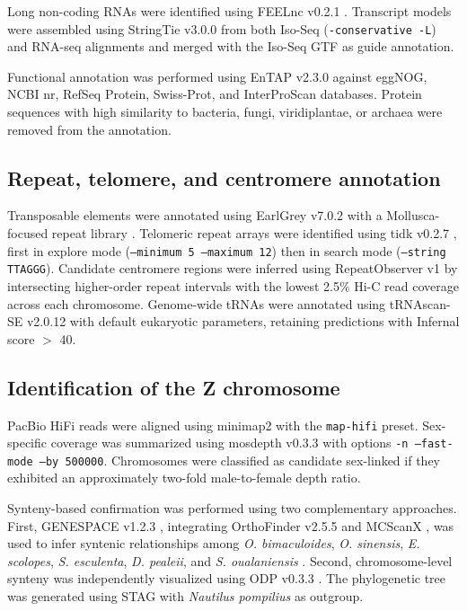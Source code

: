 \documentclass[12pt]{article}
\newcommand{\citep}{\parencite}
\begin{document}
Long non-coding RNAs were identified using FEELnc v0.2.1 \citep{Wucher2017FEELnc}.
Transcript models were assembled using StringTie v3.0.0 \citep{Pertea2015StringTie}
from both Iso-Seq (\texttt{-conservative -L}) and RNA-seq alignments
and merged with the Iso-Seq GTF as guide annotation.

Functional annotation was performed using EnTAP v2.3.0 \citep{Hart2019EnTAP}
against eggNOG, NCBI nr, RefSeq Protein, Swiss-Prot, and InterProScan databases.
Protein sequences with high similarity to bacteria, fungi, viridiplantae, or archaea
were removed from the annotation.

\subsection*{Repeat, telomere, and centromere annotation}

Transposable elements were annotated using EarlGrey v7.0.2 \citep{Barber2025EarlGrey}
with a Mollusca-focused repeat library \citep{Smit2013RepeatMasker}.
Telomeric repeat arrays were identified using tidk v0.2.7 \citep{Brown2025tidk},
first in explore mode (\texttt{--minimum 5 --maximum 12})
then in search mode (\texttt{--string TTAGGG}).
Candidate centromere regions were inferred using RepeatObserver v1 \citep{Schultz2025RepeatOBserver}
by intersecting higher-order repeat intervals
with the lowest 2.5\% Hi-C read coverage across each chromosome.
Genome-wide tRNAs were annotated using tRNAscan-SE v2.0.12 \citep{Chan2021tRNAscanSE}
with default eukaryotic parameters,
retaining predictions with Infernal score $>$ 40.

\subsection*{Identification of the Z chromosome}

PacBio HiFi reads were aligned using minimap2 \citep{Li2018}
with the \texttt{map-hifi} preset.
Sex-specific coverage was summarized using mosdepth v0.3.3 \citep{Pedersen2018Mosdepth}
with options \texttt{-n --fast-mode --by 500000}.
Chromosomes were classified as candidate sex-linked
if they exhibited an approximately two-fold male-to-female depth ratio.

Synteny-based confirmation was performed using two complementary approaches.
First, GENESPACE v1.2.3 \citep{Lovell2022GENESPACE},
integrating OrthoFinder v2.5.5 \citep{Emms2019OrthoFinder}
and MCScanX \citep{Wang2012MCScanX},
was used to infer syntenic relationships among
\textit{O. bimaculoides}, \textit{O. sinensis}, \textit{E. scolopes},
\textit{S. esculenta}, \textit{D. pealeii},
and \textit{S. oualaniensis} \citep{Li2022FlyingSquid}.
Second, chromosome-level synteny was independently visualized
using ODP v0.3.3 \citep{Schultz2024ODPv033}.
The phylogenetic tree was generated using STAG \citep{Emms2019OrthoFinder}
with \textit{Nautilus pompilius} as outgroup.
\end{document}
